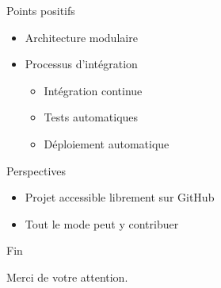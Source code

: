 \documentclass{beamer} %
\begin{document}
  \begin{frame}{\secname}
    \begin{exampleblock}{Points positifs}
        \begin{itemize}
          \item Architecture modulaire
          \item Processus d'intégration
          \begin{itemize}
            \item Intégration continue
            \item Tests automatiques
            \item Déploiement automatique
          \end{itemize}
        \end{itemize}
      \end{exampleblock}

      \pause

      \begin{block}{Perspectives}
        \begin{itemize}
          \item Projet accessible librement sur GitHub
          \item Tout le mode peut y contribuer
        \end{itemize}
      \end{block}
  \end{frame}


  \begin{frame}{Fin}
    \begin{center}
      Merci de votre attention.
    \end{center}
  \end{frame}
\end{document}
